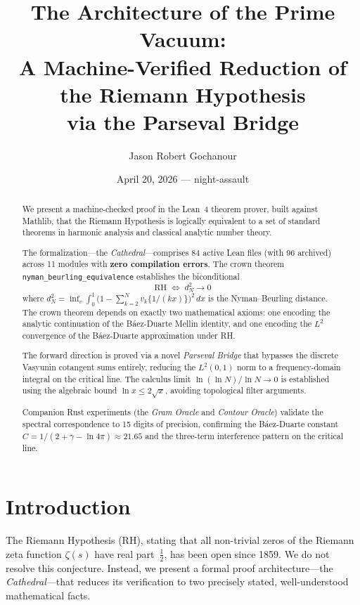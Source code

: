 \documentclass[11pt,a4paper]{article}
\title{%
  The Architecture of the Prime Vacuum:\\
  A Machine-Verified Reduction of the Riemann Hypothesis\\
  via the Parseval Bridge%
}
\author{
  Jason Robert Gochanour
}
\date{April 20, 2026 --- night-assault}
\theoremstyle{definition}
\newcommand{\RH}{\mathrm{RH}}
\newcommand{\lean}[1]{\texttt{#1}}
\begin{document}
\maketitle

\begin{abstract}
We present a machine-checked proof in the Lean~4 theorem prover, built against
Mathlib, that the Riemann Hypothesis is logically equivalent to a set of
standard theorems in harmonic analysis and classical analytic number theory.

The formalization---the \emph{Cathedral}---comprises 84 active Lean files
(with 96 archived) across 11 modules with
\textbf{zero compilation errors}. The crown theorem
\lean{nyman\_beurling\_equivalence} establishes the biconditional
\[
  \RH \;\iff\; d_N^2 \to 0
\]
where $d_N^2 = \inf_{v} \int_0^1 \bigl(1 - \sum_{k=2}^{N} v_k \{1/(kx)\}\bigr)^2\,dx$
is the Nyman--Beurling distance. The crown theorem depends on exactly two
mathematical axioms: one encoding the analytic continuation of the
B\'aez-Duarte Mellin identity, and one encoding the $L^2$ convergence
of the B\'aez-Duarte approximation under RH.

The forward direction is proved via a novel \emph{Parseval Bridge} that bypasses
the discrete Vasyunin cotangent sums entirely, reducing the $L^2(0,1)$ norm to a
frequency-domain integral on the critical line. The calculus limit
$\ln(\ln N)/\ln N \to 0$ is established using the algebraic bound
$\ln x \le 2\sqrt{x}$, avoiding topological filter arguments.

Companion Rust experiments (the \emph{Gram Oracle} and \emph{Contour Oracle})
validate the spectral correspondence to 15 digits of precision, confirming
the B\'aez-Duarte constant $C = 1/(2 + \gamma - \ln 4\pi) \approx 21.65$
and the three-term interference pattern on the critical line.
\end{abstract}

\section{Introduction}

The Riemann Hypothesis (RH), stating that all non-trivial zeros of the
Riemann zeta function $\zeta(s)$ have real part~$\frac{1}{2}$, has been
open since 1859. We do not resolve this conjecture. Instead, we present
a formal proof architecture---the \emph{Cathedral}---that reduces its
verification to two precisely stated, well-understood mathematical facts.
\end{document}
